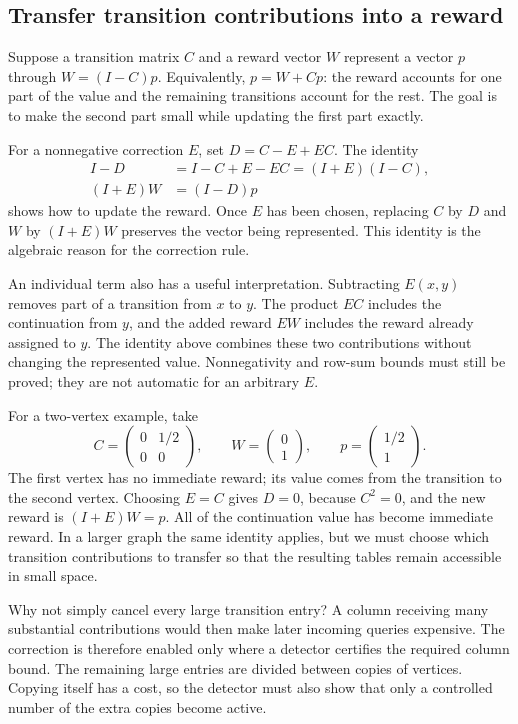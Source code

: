 \subsection{Transfer transition contributions into a reward}

Suppose a transition matrix $C$ and a reward vector $W$ represent a vector $p$ through $W=(I-C)p$. Equivalently, $p=W+Cp$: the reward accounts for one part of the value and the remaining transitions account for the rest. The goal is to make the second part small while updating the first part exactly.

For a nonnegative correction $E$, set $D=C-E+EC$. The identity
\[
 \begin{aligned}
 I-D&=I-C+E-EC=(I+E)(I-C),\\
 (I+E)W&=(I-D)p
 \end{aligned}
\]
shows how to update the reward. Once $E$ has been chosen, replacing $C$ by $D$ and $W$ by $(I+E)W$ preserves the vector being represented. This identity is the algebraic reason for the correction rule.

An individual term also has a useful interpretation. Subtracting $E(x,y)$ removes part of a transition from $x$ to $y$. The product $EC$ includes the continuation from $y$, and the added reward $EW$ includes the reward already assigned to $y$. The identity above combines these two contributions without changing the represented value. Nonnegativity and row-sum bounds must still be proved; they are not automatic for an arbitrary $E$.

For a two-vertex example, take
\[
 C=\begin{pmatrix}0&1/2\\0&0\end{pmatrix},\qquad
 W=\begin{pmatrix}0\\1\end{pmatrix},\qquad
 p=\begin{pmatrix}1/2\\1\end{pmatrix}.
\]
The first vertex has no immediate reward; its value comes from the transition to the second vertex. Choosing $E=C$ gives $D=0$, because $C^2=0$, and the new reward is $(I+E)W=p$. All of the continuation value has become immediate reward. In a larger graph the same identity applies, but we must choose which transition contributions to transfer so that the resulting tables remain accessible in small space.

Why not simply cancel every large transition entry? A column receiving many substantial contributions would then make later incoming queries expensive. The correction is therefore enabled only where a detector certifies the required column bound. The remaining large entries are divided between copies of vertices. Copying itself has a cost, so the detector must also show that only a controlled number of the extra copies become active.

